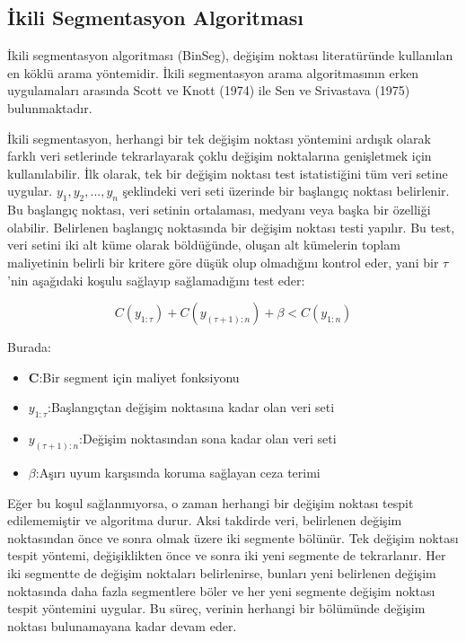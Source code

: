 \documentclass[12pt,twoside]{deuthesis}
\begin{document}
\hypertarget{ikili-segmentasyon-algoritmasux131}{%
\subsection{İkili Segmentasyon Algoritması}\label{ikili-segmentasyon-algoritmasux131}}

İkili segmentasyon algoritması (BinSeg), değişim noktası literatüründe kullanılan en köklü arama yöntemidir. İkili segmentasyon arama algoritmasının erken uygulamaları arasında Scott ve Knott (1974) ile Sen ve Srivastava (1975) bulunmaktadır.

İkili segmentasyon, herhangi bir tek değişim noktası yöntemini ardışık olarak farklı veri setlerinde tekrarlayarak çoklu değişim noktalarına genişletmek için kullanılabilir. İlk olarak, tek bir değişim noktası test istatistiğini tüm veri setine uygular. \(y_{1},y_{2},...,y_{n}\) şeklindeki veri seti üzerinde bir başlangıç noktası belirlenir. Bu başlangıç noktası, veri setinin ortalaması, medyanı veya başka bir özelliği olabilir. Belirlenen başlangıç noktasında bir değişim noktası testi yapılır. Bu test, veri setini iki alt küme olarak böldüğünde, oluşan alt kümelerin toplam maliyetinin belirli bir kritere göre düşük olup olmadığını kontrol eder, yani bir \(\tau\)'nin aşağıdaki koşulu sağlayıp sağlamadığını test eder:

\[C(y_{1:\tau}) + C(y_{(\tau+1):n}) + \beta < C(y_{1:n})\]

Burada:

\begin{itemize}
\item\textbf{C}:Bir segment için maliyet fonksiyonu
\item\textbf{$y_{1:\tau}$}:Başlangıçtan değişim noktasına kadar olan veri seti
\item\textbf{$y_{(\tau+1):n}$}:Değişim noktasından sona kadar olan veri seti
\item\textbf{$\beta$}:Aşırı uyum karşısında koruma sağlayan ceza terimi
\end{itemize}

Eğer bu koşul sağlanmıyorsa, o zaman herhangi bir değişim noktası tespit edilememiştir ve algoritma durur. Aksi takdirde veri, belirlenen değişim noktasından önce ve sonra olmak üzere iki segmente bölünür. Tek değişim noktası tespit yöntemi, değişiklikten önce ve sonra iki yeni segmente de tekrarlanır. Her iki segmentte de değişim noktaları belirlenirse, bunları yeni belirlenen değişim noktasında daha fazla segmentlere böler ve her yeni segmente değişim noktası tespit yöntemini uygular. Bu süreç, verinin herhangi bir bölümünde değişim noktası bulunamayana kadar devam eder.
\end{document}
